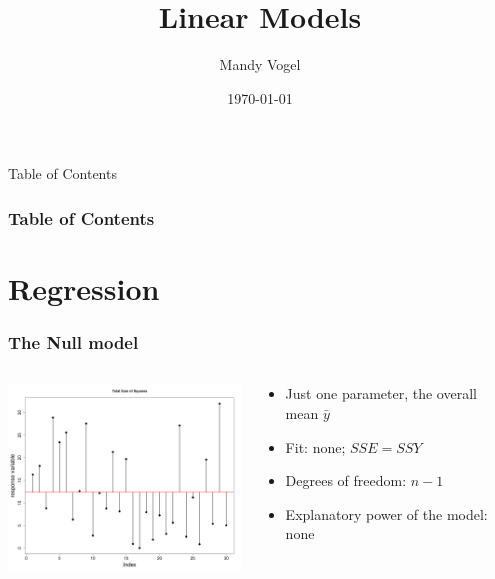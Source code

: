 \documentclass[xcolor={table}]{beamer}
\begin{document}
\title{Linear Models}   
\author{Mandy Vogel} 
\date{\today}


\begin{frame}
\titlepage
\end{frame}

\begin{frame}{Table of Contents}
\frametitle{Table of Contents}\tableofcontents
\end{frame}

\section{Regression}

\begin{frame}\frametitle{The Null model}
\begin{columns}
\begin{column}{0.6\textwidth}
\includegraphics[width=6.5cm]{nullmodel.png}
\end{column}
\begin{column}{0.4\textwidth}
\begin{itemize}
\item Just one parameter, the overall mean $\bar{y}$
\item Fit: none; $SSE = SSY$
\item Degrees of freedom: $n-1$
\item Explanatory power of the model: none
\end{itemize}
\end{column}
\end{columns}
\end{frame}
\end{document}
